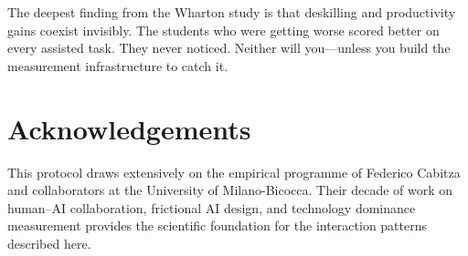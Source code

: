 \documentclass[11pt,a4paper]{article}
\begin{document}
The deepest finding from the Wharton study \citep{bastani2025learning} is that
deskilling and productivity gains coexist invisibly. The students who were getting
worse scored better on every assisted task. They never noticed. Neither will
you---unless you build the measurement infrastructure to catch it.

\section*{Acknowledgements}

This protocol draws extensively on the empirical programme of Federico Cabitza and
collaborators at the University of Milano-Bicocca. Their decade of work on
human--AI collaboration, frictional AI design, and technology dominance
measurement provides the scientific foundation for the interaction patterns
described here.



\end{document}
